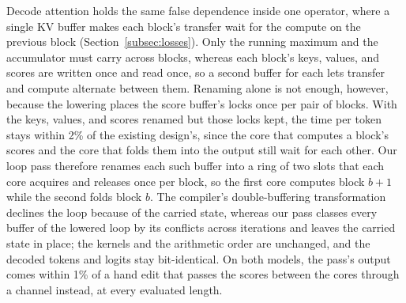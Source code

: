 Decode attention holds the same false dependence inside one operator, where a single KV buffer makes each block's transfer wait for the compute on the previous block (Section~\ref{subsec:losses}).
Only the running maximum and the accumulator must carry across blocks, whereas each block's keys, values, and scores are written once and read once, so a second buffer for each lets transfer and compute alternate between them.
Renaming alone is not enough, however, because the lowering places the score buffer's locks once per pair of blocks.
With the keys, values, and scores renamed but those locks kept, the time per token stays within 2\% of the existing design's, since the core that computes a block's scores and the core that folds them into the output still wait for each other.
Our loop pass therefore renames each such buffer into a ring of two slots that each core acquires and releases once per block, so the first core computes block $b+1$ while the second folds block $b$.
The compiler's double-buffering transformation declines the loop because of the carried state, whereas our pass classes every buffer of the lowered loop by its conflicts across iterations and leaves the carried state in place; the kernels and the arithmetic order are unchanged, and the decoded tokens and logits stay bit-identical.
On both models, the pass's output comes within 1\% of a hand edit that passes the scores between the cores through a channel instead, at every evaluated length.

